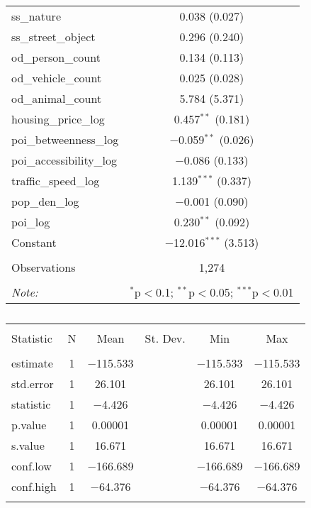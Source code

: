 \begin{table}[!htbp]
\begin{tabular}{@{\extracolsep{1pt}}lc}
  ss\_nature & 0.038 (0.027) \\ 
  ss\_street\_object & 0.296 (0.240) \\ 
  od\_person\_count & 0.134 (0.113) \\ 
  od\_vehicle\_count & 0.025 (0.028) \\ 
  od\_animal\_count & 5.784 (5.371) \\ 
  housing\_price\_log & 0.457$^{**}$ (0.181) \\ 
  poi\_betweenness\_log & $-$0.059$^{**}$ (0.026) \\ 
  poi\_accessibility\_log & $-$0.086 (0.133) \\ 
  traffic\_speed\_log & 1.139$^{***}$ (0.337) \\ 
  pop\_den\_log & $-$0.001 (0.090) \\ 
  poi\_log & 0.230$^{**}$ (0.092) \\ 
  Constant & $-$12.016$^{***}$ (3.513) \\ 
 \hline \\[-1.8ex] 
Observations & 1,274 \\ 
\hline 
\hline \\[-1.8ex] 
\textit{Note:}  & \multicolumn{1}{r}{$^{*}$p$<$0.1; $^{**}$p$<$0.05; $^{***}$p$<$0.01} \\ 
\end{tabular} 
\end{table} 

\begin{table}[!htbp] \centering 
  \caption{} 
  \label{} 
\small 
\begin{tabular}{@{\extracolsep{1pt}}lccccc} 
\\[-1.8ex]\hline 
\hline \\[-1.8ex] 
Statistic & \multicolumn{1}{c}{N} & \multicolumn{1}{c}{Mean} & \multicolumn{1}{c}{St. Dev.} & \multicolumn{1}{c}{Min} & \multicolumn{1}{c}{Max} \\ 
\hline \\[-1.8ex] 
estimate & 1 & $-$115.533 &  & $-$115.533 & $-$115.533 \\ 
std.error & 1 & 26.101 &  & 26.101 & 26.101 \\ 
statistic & 1 & $-$4.426 &  & $-$4.426 & $-$4.426 \\ 
p.value & 1 & 0.00001 &  & 0.00001 & 0.00001 \\ 
s.value & 1 & 16.671 &  & 16.671 & 16.671 \\ 
conf.low & 1 & $-$166.689 &  & $-$166.689 & $-$166.689 \\ 
conf.high & 1 & $-$64.376 &  & $-$64.376 & $-$64.376 \\ 
\hline \\[-1.8ex] 
\end{tabular} 
\end{table} 

